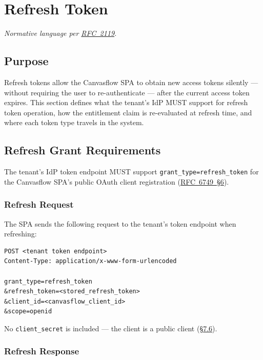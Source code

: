 
\section{Refresh Token}

\textit{Normative language per \href{https://tools.ietf.org/html/rfc2119}{RFC~2119}.}

\subsection{Purpose}

Refresh tokens allow the Canvasflow SPA to obtain new access tokens silently --- without
requiring the user to re-authenticate --- after the current access token expires. This
section defines what the tenant's IdP MUST support for refresh token operation, how the
entitlement claim is re-evaluated at refresh time, and where each token type travels in
the system.

\subsection{Refresh Grant Requirements}

The tenant's IdP token endpoint MUST support \texttt{grant\_type=refresh\_token} for the
Canvasflow SPA's public OAuth client registration 
(\href{https://tools.ietf.org/html/rfc6749\#section-6}{RFC~6749~\S6}).

\subsubsection{Refresh Request}

The SPA sends the following request to the tenant's token endpoint when refreshing:

\begin{lstlisting}
POST <tenant token endpoint>
Content-Type: application/x-www-form-urlencoded

grant_type=refresh_token
&refresh_token=<stored_refresh_token>
&client_id=<canvasflow_client_id>
&scope=openid
\end{lstlisting}

No \texttt{client\_secret} is included --- the client is a public client (\hyperref[sec:token-endpoint-authentication]{\S7.6}).

\subsubsection{Refresh Response}

